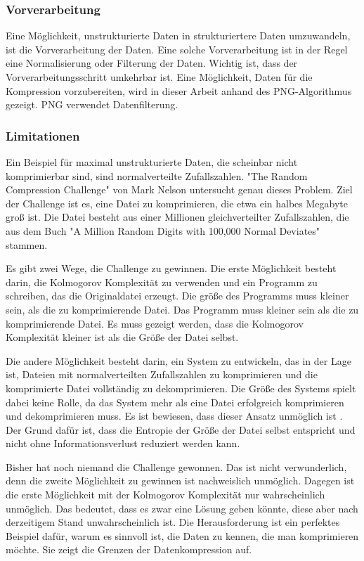 \documentclass[conference]{IEEEtran}
\begin{document}
\subsubsection{Vorverarbeitung}

Eine Möglichkeit, unstrukturierte Daten in strukturiertere Daten umzuwandeln, ist 
die Vorverarbeitung der Daten. 
Eine solche Vorverarbeitung ist in der Regel eine Normalisierung oder Filterung 
der Daten. 
Wichtig ist, dass der Vorverarbeitungsschritt umkehrbar ist. 
Eine Möglichkeit, Daten für die Kompression vorzubereiten, wird in dieser Arbeit 
anhand des PNG-Algorithmus gezeigt. 
PNG verwendet Datenfilterung.

\subsubsection{Limitationen}

Ein Beispiel für maximal unstrukturierte Daten, die scheinbar nicht komprimierbar 
sind, sind normalverteilte Zufallszahlen. 
"The Random Compression Challenge" von Mark Nelson \cite{nelson} untersucht 
genau dieses Problem. 
Ziel der Challenge ist es, eine Datei zu komprimieren, die etwa ein halbes Megabyte groß ist.
Die Datei besteht aus einer Millionen gleichverteilter Zufallszahlen, die aus dem 
Buch "A Million Random Digits with 100,000 Normal Deviates" \cite{amilli} stammen.

Es gibt zwei Wege, die Challenge zu gewinnen.
Die erste Möglichkeit besteht darin, die Kolmogorov Komplexität zu verwenden und 
ein Programm zu schreiben, das die Originaldatei erzeugt.
Die größe des Programms muss kleiner sein, als die zu komprimierende Datei.
Das Programm muss kleiner sein als die zu komprimierende Datei. Es muss gezeigt werden, 
dass die Kolmogorov Komplexität kleiner ist als die Größe der Datei selbst.

Die andere Möglichkeit besteht darin, ein System zu entwickeln, das in der Lage 
ist, Dateien mit normalverteilten Zufallszahlen zu komprimieren und die komprimierte 
Datei vollständig zu dekomprimieren. 
Die Größe des Systems spielt dabei keine Rolle, da das System mehr als eine Datei 
erfolgreich komprimieren und dekomprimieren muss. 
Es ist bewiesen, dass dieser Ansatz unmöglich ist \cite{nelson}. 
Der Grund dafür ist, dass die Entropie der Größe der Datei selbst entspricht und 
nicht ohne Informationsverlust reduziert werden kann.

Bisher hat noch niemand die Challenge gewonnen. 
Das ist nicht verwunderlich, denn die zweite Möglichkeit zu gewinnen ist 
nachweislich unmöglich. 
Dagegen ist die erste Möglichkeit mit der Kolmogorov Komplexität nur wahrscheinlich 
unmöglich. 
Das bedeutet, dass es zwar eine Lösung geben könnte, diese aber nach derzeitigem 
Stand unwahrscheinlich ist. 
Die Herausforderung ist ein perfektes Beispiel dafür, warum es sinnvoll ist, die 
Daten zu kennen, die man komprimieren möchte. 
Sie zeigt die Grenzen der Datenkompression auf.
\end{document}
